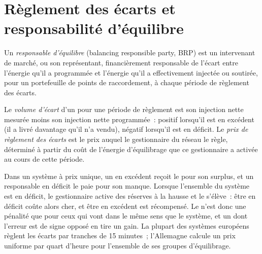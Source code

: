 \section{Règlement des écarts et responsabilité d'équilibre}

\begin{definition}\label{def:m3:power-markets-trading:brp}
Un \emph{responsable d'équilibre} (balancing responsible party, BRP) est un intervenant de marché,
ou son représentant, financièrement responsable de l'écart entre
l'énergie qu'il a programmée et l'énergie qu'il a effectivement injectée ou soutirée, pour un portefeuille de
points de raccordement, à chaque période de règlement des écarts.
\end{definition}

\begin{definition}\label{def:m3:power-markets-trading:imbalance}
Le \emph{volume d'écart} d'un  pour une période de règlement est son
injection nette mesurée moins son injection nette programmée~: positif lorsqu'il est en excédent (il a livré
davantage qu'il n'a vendu), négatif lorsqu'il est en déficit. Le \emph{prix de règlement des écarts} est
le prix auquel le gestionnaire du réseau le règle, déterminé à partir du coût de l'énergie d'équilibrage
que ce gestionnaire a activée au cours de cette période.
\end{definition}

Dans un système à prix unique, un  en excédent reçoit le  pour son surplus, et un responsable en déficit
le paie pour son manque. Lorsque l'ensemble du système est en déficit, le gestionnaire active des réserves à la hausse
et le  s'élève~: être en déficit coûte alors cher, et être en excédent est
récompensé. Le  n'est donc une pénalité que pour ceux qui vont dans le même
sens que le système, et un  dont l'erreur est de signe opposé en tire un gain. La plupart
des systèmes européens règlent les écarts par tranches de 15 minutes~; l'Allemagne calcule un prix uniforme par
quart d'heure pour l'ensemble de ses groupes d'équilibrage.

